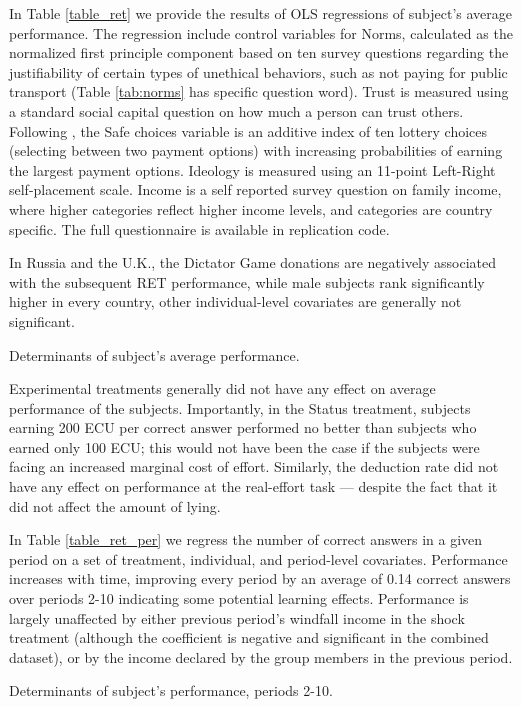 \documentclass[12pt]{article}
\begin{document}
In Table \ref{table_ret} we provide the results of OLS regressions of subject's average performance. The regression include control variables for Norms, calculated as the normalized first principle component based on ten survey questions regarding the justifiability of certain types of unethical behaviors, such as not paying for public transport (Table \ref{tab:norms} has specific question word). Trust is measured using a standard social capital question on how much a person can trust others. Following \cite{Holtetal2002}, the Safe choices variable is an additive index of ten lottery choices (selecting between two payment options) with increasing probabilities of earning the largest payment options. Ideology is measured using an 11-point Left-Right self-placement scale. Income is a self reported survey question on family income, where higher categories reflect higher income levels, and categories are country specific. The full questionnaire is available in replication code.    

In Russia and the U.K., the Dictator Game donations are negatively associated with the subsequent RET performance, while male subjects rank significantly higher in every country, other individual-level covariates are generally not significant.

\begin{table}[ht]
\scriptsize
\begin{center}

\end{center}
\caption{Determinants of subject's average performance.}
\label{table_ret}
\end{table}

Experimental treatments generally did not have any effect on average performance of the subjects. Importantly, in the Status treatment, subjects earning 200 ECU per correct answer performed no better than subjects who earned only 100 ECU; this would not have been the case if the subjects were facing an increased marginal cost of effort. Similarly, 
the deduction rate did not have any effect on performance at the real-effort task --- despite the fact that it did not affect the amount of lying. 

In Table \ref{table_ret_per} we regress the number of correct answers in a given period on a set of treatment, individual, and period-level covariates. Performance increases with time, improving every period by an average of 0.14 correct answers over periods 2-10 indicating some potential learning effects. %
Performance is largely unaffected by either previous period's windfall income in the shock treatment (although the coefficient is negative and significant in the combined dataset), or by the income declared by the group members in the previous period. 
\begin{table}[ht]
\scriptsize
\begin{center}

\end{center}
\caption{Determinants of subject's performance, periods 2-10.}
\label{table_ret_per}
\end{table}
\end{document}
